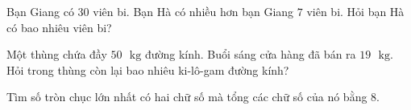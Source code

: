 \begin{bt}[1,5 điểm]
Bạn Giang có $30$ viên bi. Bạn Hà có nhiều hơn bạn Giang $7$ viên bi. Hỏi bạn Hà có bao nhiêu viên bi?
\end{bt}

\begin{bt}[1,0 điểm]
Một thùng chứa đầy $50\text{ }\text{kg}$ đường kính. Buổi sáng cửa hàng đã bán ra $19\text{ }\text{kg}$. Hỏi trong thùng còn lại bao nhiêu ki-lô-gam đường kính?
\end{bt}

\begin{bt}[1,0 điểm]
Tìm số tròn chục lớn nhất có hai chữ số mà tổng các chữ số của nó bằng $8$.
\end{bt}
